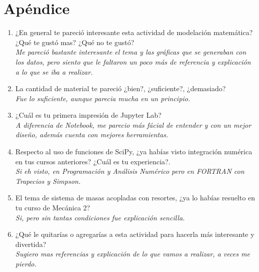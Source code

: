 \documentclass[12pt]{article}
\begin{document}
\section*{Apéndice}
\begin{enumerate}
\item ¿En general te pareció interesante esta actividad de modelación matemática? ¿Qué te gustó mas? ¿Qué no te gustó?\\
\textit{Me pareció bastante interesante el tema y las gráficas que se generaban con los datos, pero siento que le faltaron un poco más de referencia y explicación a lo que se iba a realizar.}

\item La cantidad de material te pareció ¿bien?, ¿suficiente?, ¿demasiado?\\
\textit{Fue lo suficiente, aunque parecia mucha en un principio.}

\item ¿Cuál es tu primera impresión de Jupyter Lab? \\
\textit{A diferencia de Notebook, me parecio más fácial de entender y con un mejor diseño, además cuenta con mejores herramientas.}

\item Respecto al uso de funciones de SciPy, ¿ya habías visto integración numérica en tus cursos anteriores? ¿Cuál es tu experiencia?.\\
\textit{Si eh visto, en Programación y Análisis Numérico pero en FORTRAN con Trapecios y Simpson.}

\item El tema de sistema de masas acopladas con resortes, ¿ya lo habías resuelto en tu curso de Mecánica 2?  \\
\textit{Si, pero sin tantas condiciones fue explicación sencilla.}

\item ¿Qué le quitarías o agregarías a esta actividad para hacerla más interesante y divertida? \\
\textit{Sugiero mas referencias y explicación de lo que vamos a realizar, a veces me pierdo.}
\end{enumerate}
\end{document}
